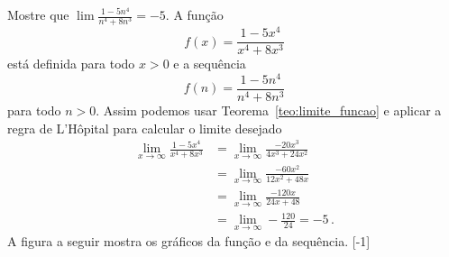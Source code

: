 \begin{example}
  Mostre que \(\lim\frac{1-5n^4}{n^4+8n^3}=-5\).
  \solution
  A função
  \[
    f(x) = \frac{1-5x^4}{x^4+8x^3}
  \]
  está definida para todo $x>0$ e a sequência
  \[
    f(n)=\frac{1-5n^4}{n^4+8n^3}
  \]
  para todo $n > 0$.
  Assim podemos usar Teorema~\ref{teo:limite_funcao} e aplicar a regra de L'Hôpital
  para calcular o limite desejado
  \begin{align*}
    \lim_{x\to\infty} \frac{1-5x^4}{x^4+8x^3} & = \lim_{x\to\infty} \frac{-20x^3}{4x^3+24x^2} \\[2mm]
                                              & = \lim_{x\to\infty} \frac{-60x^2}{12x^2+48x}  \\[2mm]
                                              & = \lim_{x\to\infty} \frac{-120x}{24x+48}      \\[2mm]
                                              & = \lim_{x\to\infty} -\frac{120}{24}
                                                = -5    \,.
  \end{align*}
  A figura a seguir mostra os gráficos da função e da sequência.
  [-1]
\end{example}

